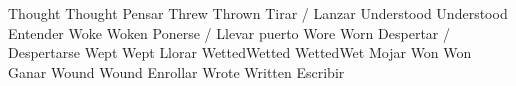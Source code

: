 	            {Thought}{}	            {Thought}{}             {Pensar}{}
	            {Threw}{}	            {Thrown}{}              {Tirar / Lanzar}{}
	        {Understood}{}	        {Understood}{}          {Entender}{}
	            {Woke}{}	            {Woken}{}               {Ponerse / Llevar puerto}{}
	            {Wore}{}	            {Worn}{}                {Despertar / Despertarse}{}
	            {Wept}{}	            {Wept}{}                {Llorar}{}
	            {Wetted}{Wetted}	    {Wetted}{Wet}           {Mojar}{}
	            {Won}{}	                {Won}{}                 {Ganar}{}
	            {Wound}{}	            {Wound}{}               {Enrollar}{}
	            {Wrote}{}	            {Written}{}             {Escribir}{}